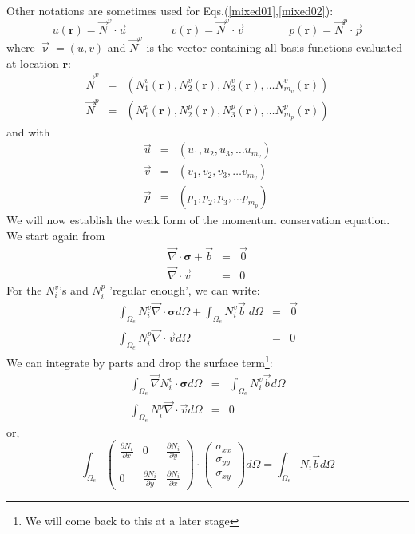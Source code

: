 Other notations are sometimes used for Eqs.(\ref{mixed01},\ref{mixed02}):
\begin{equation}
u({\bm r}) = \vec{N}^v \cdot \vec{u}
\quad\quad\quad\quad
v({\bm r}) = \vec{N}^v \cdot \vec{v}
\quad\quad\quad\quad
p({\bm r}) = \vec{N}^p \cdot \vec{p}
\end{equation} 
where ${\vec \upnu}=(u,v)$ and $\vec{N}^v$ is the vector containing all basis functions evaluated at location ${\bm r}$:
\begin{eqnarray}
\vec{N}^v &=& \left( N_1^v({\bm r}),  N_2^v({\bm r}),  N_3^v({\bm r}), \dots  N_{m_v}^v({\bm r}) \right) \\
\vec{N}^p &=& \left( N_1^p({\bm r}),  N_2^p({\bm r}),  N_3^p({\bm r}), \dots  N_{m_p}^p({\bm r}) \right)
\end{eqnarray}
and with 
\begin{eqnarray}
\vec{u} &=& \left( u_1,  u_2,  u_3, \dots  u_{m_v} \right) \\
\vec{v} &=& \left( v_1,  v_2,  v_3, \dots  v_{m_v} \right) \\
\vec{p} &=& \left( p_1,  p_2,  p_3, \dots  p_{m_p} \right) 
\end{eqnarray}
We will now establish the weak form of the momentum conservation equation. 
We start again from 
\begin{eqnarray}
{\vec \nabla}\cdot {\bm \sigma} + {\vec b} &=& {\vec 0} \\
{\vec \nabla}\cdot {\vec v} &=& 0
\end{eqnarray}
For the $N_i^v$'s and $N_i^p$ 'regular enough', we can write:
\begin{eqnarray}
\int_{\Omega_e} N_i^v {\vec \nabla}\cdot {\bm \sigma} d\Omega + \int_{\Omega_e} N_i^v  {\vec b} \; d\Omega 
&=& \vec 0 \\
\int_{\Omega_e} N_i^p {\vec \nabla}\cdot {\vec v} d\Omega &=& 0
\end{eqnarray}
We can integrate by parts and drop the surface term\footnote{We will come back to this at a later stage}:
\begin{eqnarray}
\int_{\Omega_e} {\vec \nabla } N_i^v \cdot {\bm \sigma} d\Omega &=& \int_{\Omega_e} N_i^v  {\vec b} d\Omega \\
\int_{\Omega_e} N_i^p {\vec \nabla}\cdot {\vec v} d\Omega &=& 0
\end{eqnarray}
or, 
\begin{equation}
\int_{\Omega_e} 
\left(
\begin{array}{ccc}
\frac{\partial N_i}{\partial x} & 0 & \frac{\partial N_i}{\partial y} \\  \\
0 & \frac{\partial N_i}{\partial y} &  \frac{\partial N_i}{\partial x}  
\end{array}
\right)
\cdot
\left(
\begin{array}{c}
\sigma_{xx}\\
\sigma_{yy}\\
\sigma_{xy}\\
\end{array}
\right)
d\Omega = \int_{\Omega_e} N_i {\vec b} d\Omega 
\end{equation}
